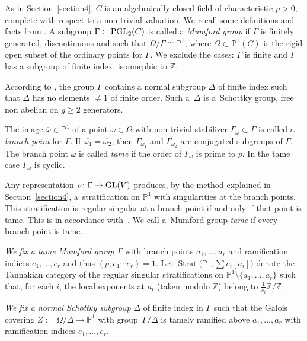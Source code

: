 \documentclass[10pt,a4paper]{amsart}
\numberwithin{equation}{section}
\begin{document}
As in Section~\ref{section4}, $C$ is an algebraically closed field of characteristic $p>0$, complete with respect to a non trivial valuation. We recall some definitions and facts from \cite[Section~9]{Vo-vdP}. A subgroup $\Gamma \subset {\rm PGL}_2(C)$ is called a {\it Mumford group} if $\Gamma$ is finitely generated, discontinuous and such that $\Omega /\Gamma\cong \mathbb{P}^1$, where $\Omega \subset \mathbb{P}^1(C)$ is the rigid open subset of the ordinary points for $\Gamma$. We exclude the cases: $\Gamma$ is finite and $\Gamma$ has a subgroup of finite index, isomorphic to $\mathbb{Z}$.

According to \cite[Theorem I.3.1]{Ge-vdP}, the group $\Gamma$ contains a normal subgroup $\Delta$ of finite index such that $\Delta$ has no elements $\neq 1$ of finite order. Such a~$\Delta$ is a~Schottky group, free non abelian on $g \geq 2$ generators.

The image $\overline{\omega}\in \mathbb{P}^1$ of a point $\omega \in \Omega$ with non trivial stabilizer $\Gamma_\omega\subset \Gamma$ is called a {\it branch point} for $\Gamma$. If $\overline{\omega _1}=\overline{\omega_2}$, then $\Gamma_{\omega_1}$ and $\Gamma_{\omega_2}$ are conjugated subgroups of $\Gamma$. The branch point $\overline{\omega}$ is called {\it tame} if the order of $\Gamma_\omega$ is prime to $p$. In the tame case $\Gamma_\omega$ is cyclic.

Any representation $\rho\colon \Gamma \rightarrow {\rm GL}(V)$ produces, by the method explained in Section~\ref{section4}, a~stra\-ti\-fication on $\mathbb{P}^1$ with singularities at the branch points. This stratification is regular singular at a branch point if and only if that point is tame. This is in accordance with~\cite{Ki}. We call a~Mumford group {\it tame} if every branch point is tame.

{\it We fix a tame Mumford group $\Gamma$} with branch points $a_1,\dots ,a_r$ and ramification indices $e_1,\dots ,e_r$ and thus $(p, e_1\cdots e_r)=1$. Let $\operatorname{Strat}\big(\mathbb{P}^1,\sum e_i[a_i]\big)$ denote the Tannakian category of the regular singular stratifications on $\mathbb{P}^1\setminus \{a_1,\dots ,a_r\}$ such that, for each $i$, the local exponents at $a_i$ (taken modulo $\mathbb{Z}$) belong to $\frac{1}{e_i}\mathbb{Z}/\mathbb{Z}$.

{\it We fix a normal Schottky subgroup} $\Delta$ of finite index in $\Gamma$ such that the Galois covering $Z:=\Omega/ \Delta \rightarrow \mathbb{P}^1$ with group~$\Gamma/\Delta$ is tamely ramified above $a_1,\dots ,a_r$ with ramification indices $e_1,\dots ,e_r$.
\end{document}
